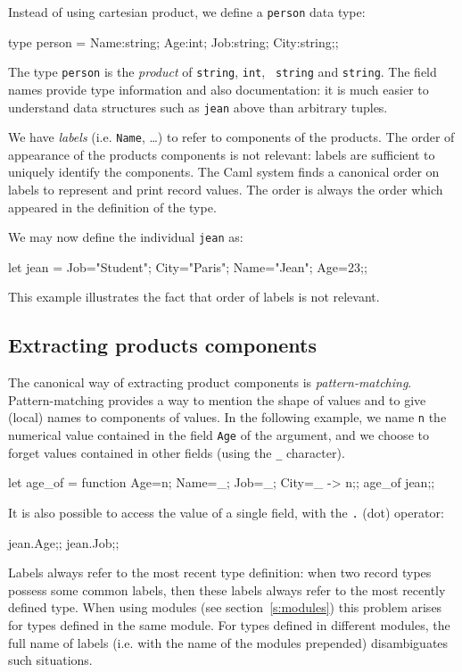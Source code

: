 Instead of using cartesian product, we define a {\tt person} data
type:
\begin{caml_example}
type person =
  {Name:string; Age:int; Job:string; City:string};;
\end{caml_example}
The type {\tt person} is the {\em product} of {\tt string}, {\tt int}, {\tt
string} and {\tt string}.
The field names provide type information and also documentation: it
is much easier to understand data structures such as {\tt jean} above than
arbitrary tuples.
%

We have {\em labels} (i.e. {\tt Name}, \ldots) to refer to components of
the products. The order of appearance of the products components is not
relevant: labels are sufficient to uniquely identify the components.
The Caml system finds a canonical order on labels
to represent and print record values. The order is always the order which
appeared in the definition of the type.
%

We may now define the individual {\tt jean} as:
\begin{caml_example}
let jean = {Job="Student"; City="Paris";
            Name="Jean"; Age=23};;
\end{caml_example}
This example illustrates the fact that order of labels is not
relevant.

\subsection{Extracting products components}

The canonical way of extracting product components is {\em pattern-matching}.
Pattern-matching provides a way to mention the shape of values and to give
(local) names to components of values.
In the following example, we name {\tt n} the numerical value contained in
the field {\tt Age} of the argument, and we choose to forget values
contained in other fields (using the \verb"_" character).%
\begin{caml_example}
let age_of = function
     {Age=n; Name=_; Job=_; City=_} -> n;;
age_of jean;;
\end{caml_example}
It is also possible to access the value of a single field, with the
{\tt .} (dot) operator:
\begin{caml_example}
jean.Age;;
jean.Job;;
\end{caml_example}
Labels always refer to the most recent type definition: when two
record types possess some common labels, then these labels always
refer to the most recently defined type. When using modules (see
section~\ref{s:modules}) this problem arises for types defined in
the same module. For types defined in different modules, the full name
of labels (i.e. with the name of the modules prepended) disambiguates
such situations.

